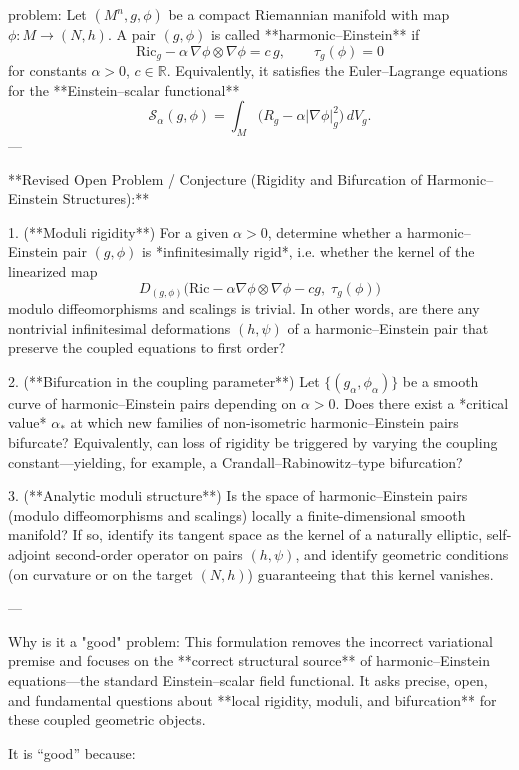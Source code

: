 problem:  
Let \((M^n,g,\phi)\) be a compact Riemannian manifold with map \(\phi:M\to (N,h)\).  
A pair \((g,\phi)\) is called **harmonic–Einstein** if  
\[
\mathrm{Ric}_g - \alpha \,\nabla\phi\otimes\nabla\phi = c\, g, \qquad \tau_g(\phi)=0
\]
for constants \(\alpha>0\), \(c\in\mathbb{R}\).  
Equivalently, it satisfies the Euler–Lagrange equations for the **Einstein–scalar functional**
\[
\mathcal{S}_\alpha(g,\phi)=\int_M\bigl(R_g-\alpha|\nabla\phi|^2_g\bigr)\,dV_g.
\]
---

**Revised Open Problem / Conjecture (Rigidity and Bifurcation of Harmonic–Einstein Structures):**

1. (**Moduli rigidity**)  
   For a given \(\alpha>0\), determine whether a harmonic–Einstein pair \((g,\phi)\) is *infinitesimally rigid*, i.e. whether the kernel of the linearized map
   \[
   D_{(g,\phi)}\bigl(\mathrm{Ric} - \alpha\nabla\phi\otimes\nabla\phi-c g,\; \tau_g(\phi)\bigr)
   \]
   modulo diffeomorphisms and scalings is trivial.  
   In other words, are there any nontrivial infinitesimal deformations \((h,\psi)\) of a harmonic–Einstein pair that preserve the coupled equations to first order?

2. (**Bifurcation in the coupling parameter**)  
   Let \(\{(g_\alpha,\phi_\alpha)\}\) be a smooth curve of harmonic–Einstein pairs depending on \(\alpha>0\).  
   Does there exist a *critical value* \(\alpha_*\) at which new families of non-isometric harmonic–Einstein pairs bifurcate?  
   Equivalently, can loss of rigidity be triggered by varying the coupling constant—yielding, for example, a Crandall–Rabinowitz–type bifurcation?

3. (**Analytic moduli structure**)  
   Is the space of harmonic–Einstein pairs (modulo diffeomorphisms and scalings) locally a finite-dimensional smooth manifold?  
   If so, identify its tangent space as the kernel of a naturally elliptic, self-adjoint second-order operator on pairs \((h,\psi)\), and identify geometric conditions (on curvature or on the target \((N,h)\)) guaranteeing that this kernel vanishes.

---

Why is it a "good" problem:  
This formulation removes the incorrect variational premise and focuses on the **correct structural source** of harmonic–Einstein equations—the standard Einstein–scalar field functional. It asks precise, open, and fundamental questions about **local rigidity, moduli, and bifurcation** for these coupled geometric objects.  

It is “good” because:

